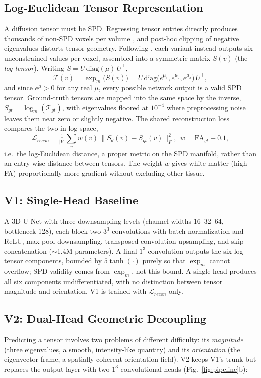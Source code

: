 \documentclass[conference,compsoc]{IEEEtran}
\begin{document}
\subsection{Log-Euclidean Tensor Representation}
\label{sec:logeuclid}
A diffusion tensor must be SPD. Regressing tensor entries directly produces thousands of non-SPD voxels per volume \cite{paper1}, and post-hoc clipping of negative eigenvalues distorts tensor geometry. Following \cite{paper1}, each variant instead outputs six unconstrained values per voxel, assembled into a symmetric matrix $S(v)$ (the \emph{log-tensor}). Writing $S=U\,\mathrm{diag}(\mu)\,U^\top$,
\begin{equation}
\mathcal{T}(v)=\exp_m\!\big(S(v)\big)=U\,\mathrm{diag}\big(e^{\mu_1},e^{\mu_2},e^{\mu_3}\big)\,U^\top,
\end{equation}
and since $e^{\mu}>0$ for any real $\mu$, every possible network output is a valid SPD tensor. Ground-truth tensors are mapped into the same space by the inverse, $S_{gt}=\log_m(\mathcal{T}_{gt})$, with eigenvalues floored at $10^{-4}$ where preprocessing noise leaves them near zero or slightly negative. The shared reconstruction loss compares the two in log space,
\begin{equation}
\mathcal{L}_{recon} = \tfrac{1}{|V|}\textstyle\sum_v w(v)\,\|S_\theta(v)-S_{gt}(v)\|_F^2,\ \ w=\text{FA}_{gt}+0.1,
\label{eq:recon}
\end{equation}
i.e.\ the log-Euclidean distance, a proper metric on the SPD manifold, rather than an entry-wise distance between tensors. The weight $w$ gives white matter (high FA) proportionally more gradient without excluding other tissue.

\subsection{V1: Single-Head Baseline}
A 3D U-Net \cite{cicek2016} with three downsampling levels (channel widths 16--32--64, bottleneck 128), each block two $3^3$ convolutions with batch normalization and ReLU, max-pool downsampling, transposed-convolution upsampling, and skip concatenation ($\sim$1.4M parameters). A final $1^3$ convolution outputs the six log-tensor components, bounded by $5\tanh(\cdot)$ purely so that $\exp_m$ cannot overflow; SPD validity comes from $\exp_m$, not this bound. A single head produces all six components undifferentiated, with no distinction between tensor magnitude and orientation. V1 is trained with $\mathcal{L}_{recon}$ only.

\subsection{V2: Dual-Head Geometric Decoupling}
Predicting a tensor involves two problems of different difficulty: its \emph{magnitude} (three eigenvalues, a smooth, intensity-like quantity) and its \emph{orientation} (the eigenvector frame, a spatially coherent orientation field). V2 keeps V1's trunk but replaces the output layer with two $1^3$ convolutional heads (Fig.~\ref{fig:pipeline}b):
\end{document}
